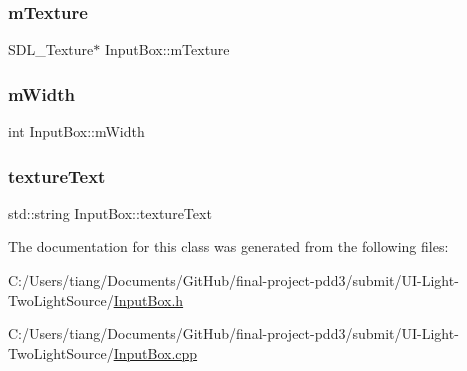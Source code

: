 \subsubsection{\texorpdfstring{m\+Texture}{mTexture}}
{\footnotesize\ttfamily S\+D\+L\+\_\+\+Texture$\ast$ Input\+Box\+::m\+Texture\hspace{0.3cm}{\ttfamily [private]}}

\mbox{\label{class_input_box_a2f409469e712032ebafe5df6c6505ef6}} 
\subsubsection{\texorpdfstring{m\+Width}{mWidth}}
{\footnotesize\ttfamily int Input\+Box\+::m\+Width\hspace{0.3cm}{\ttfamily [private]}}

\mbox{\label{class_input_box_a484ab55097789bae12b3c6e4264f836e}} 
\subsubsection{\texorpdfstring{texture\+Text}{textureText}}
{\footnotesize\ttfamily std\+::string Input\+Box\+::texture\+Text}



The documentation for this class was generated from the following files\+:\begin{DoxyCompactItemize}
\item 
C\+:/\+Users/tiang/\+Documents/\+Git\+Hub/final-\/project-\/pdd3/submit/\+U\+I-\/\+Light-\/\+Two\+Light\+Source/\mbox{\hyperlink{_input_box_8h}{Input\+Box.\+h}}\item 
C\+:/\+Users/tiang/\+Documents/\+Git\+Hub/final-\/project-\/pdd3/submit/\+U\+I-\/\+Light-\/\+Two\+Light\+Source/\mbox{\hyperlink{_input_box_8cpp}{Input\+Box.\+cpp}}\end{DoxyCompactItemize}

